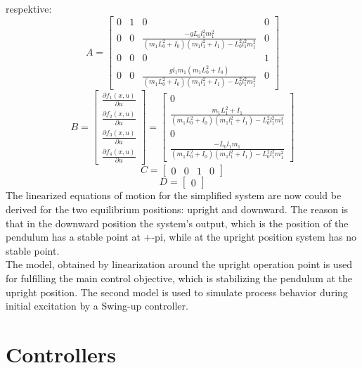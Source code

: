 respektive:
\begin{equation}
	A =\begin{bmatrix}0&1&0&0\\
	0&0&\frac{-gL_0l_1^2m_1^2}{(m_1L_0^2+I_0)(m_1l_1^2+I_1)-L_0^2l_1^2m_1^2}&0\\
	0&0&0&1\\
	0&0&\frac{gl_1m_1(m_1L_0^2+I_0)}{(m_1L_0^2+I_0)(m_1l_1^2+I_1)-L_0^2l_1^2m_1^2}&0
	\end{bmatrix}
\end{equation}
\begin{equation}B = \begin{bmatrix}
\frac{\partial f_1(x,u)}{\partial u}\\\frac{\partial f_2(x,u)}{\partial u}\\\frac{\partial f_3(x,u)}{\partial u}\\\frac{\partial f_4(x,u)}{\partial u}
\end{bmatrix}=\begin{bmatrix}
0\\ 
\frac{m_1L_1^2+I_1}{(m_1L_0^2+I_0)(m_1l_1^2+I_1)-L_0^2l_1^2m_1^2}\\0\\
\frac{-L_0l_1m_1}{(m_1L_0^2+I_0)(m_1l_1^2+I_1)-L_0^2l_1^2m_1^2}
\end{bmatrix}\end{equation}
\begin{equation}C = \begin{bmatrix}0&0&1&0\end{bmatrix}\end{equation}
\begin{equation}D = \begin{bmatrix}0\end{bmatrix}\end{equation}
The linearized equations of motion for the simplified system are now could be derived for the two equilibrium positions: upright and downward. The reason is that in the downward position the system's output, which is the position of the pendulum has a stable point at +-pi, while at the upright position system has no stable point.\\

The model, obtained by linearization around the upright operation point is used for fulfilling the main control objective, which is stabilizing the pendulum at the upright position. The second model is used to simulate process behavior during initial excitation by a Swing-up controller.
\section{Controllers}
